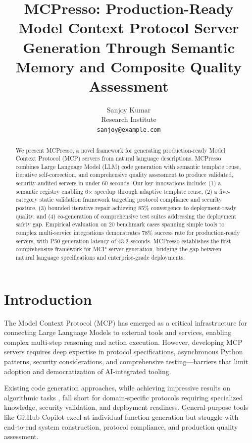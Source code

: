 \documentclass[10pt,twocolumn]{article}
\title{MCPresso: Production-Ready Model Context Protocol Server Generation Through Semantic Memory and Composite Quality Assessment}
\author{
Sanjoy Kumar\\
Research Institute\\
\texttt{sanjoy@example.com}
}
\begin{document}
\maketitle

\begin{abstract}
We present MCPresso, a novel framework for generating production-ready Model Context Protocol (MCP) servers from natural language descriptions. MCPresso combines Large Language Model (LLM) code generation with semantic template reuse, iterative self-correction, and comprehensive quality assessment to produce validated, security-audited servers in under 60 seconds. Our key innovations include: (1) a semantic registry enabling 6× speedup through adaptive template reuse, (2) a five-category static validation framework targeting protocol compliance and security posture, (3) bounded iterative repair achieving 85\% convergence to deployment-ready quality, and (4) co-generation of comprehensive test suites addressing the deployment safety gap. Empirical evaluation on 20 benchmark cases spanning simple tools to complex multi-service integrations demonstrates 78\% success rate for production-ready servers, with P50 generation latency of 43.2 seconds. MCPresso establishes the first comprehensive framework for MCP server generation, bridging the gap between natural language specifications and enterprise-grade deployments.
\end{abstract}

\section{Introduction}

The Model Context Protocol (MCP) has emerged as a critical infrastructure for connecting Large Language Models to external tools and services, enabling complex multi-step reasoning and action execution. However, developing MCP servers requires deep expertise in protocol specifications, asynchronous Python patterns, security considerations, and comprehensive testing—barriers that limit adoption and democratization of AI-integrated tooling.

Existing code generation approaches, while achieving impressive results on algorithmic tasks \cite{chen2021codex}, fall short for domain-specific protocols requiring specialized knowledge, security validation, and deployment readiness. General-purpose tools like GitHub Copilot excel at individual function generation but struggle with end-to-end system construction, protocol compliance, and production quality assessment.
\end{document}
